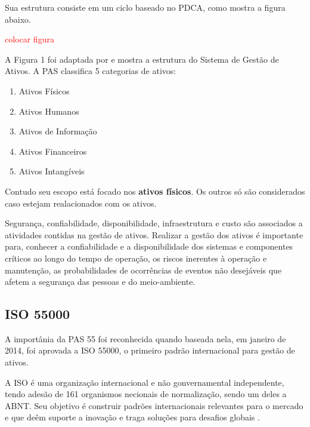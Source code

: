 Sua estrutura consiste em um ciclo baseado no PDCA, como mostra a figura abaixo.

\textcolor{red}{colocar figura}


A Figura 1 foi adaptada por \cite{valeria2013} e mostra a estrutura do Sistema de Gestão de Ativos. A PAS classifica 5 categorias de ativos:

\begin{enumerate}
	\item{Ativos Físicos}
	\item{Ativos Humanos}
	\item{Ativos de Informação}
	\item{Ativos Financeiros}
	\item{Ativos Intangíveis}
\end{enumerate}

Contudo seu escopo está focado nos \textbf{ativos físicos}. Os outros só são considerados caso estejam realacionados com os ativos.

Segurança, confiabilidade, disponibilidade, infraestrutura e custo são associados a atividades contidas na gestão de ativos. 
Realizar a gestão dos ativos é importante para, conhecer a confiabilidade e a disponibilidade dos sistemas e componentes críticos ao longo do tempo de operação, os riscos inerentes à operação e manutenção, as probabilidades de ocorrências de eventos não desejáveis que afetem a segurança das pessoas e do meio-ambiente.


\subsection{ISO 55000}

A importânia da PAS 55 foi reconhecida quando baseada nela, em janeiro de 2014, foi aprovada a ISO 55000, o primeiro padrão internacional para gestão de ativos. 

A ISO é uma organização internacional e não gonvernamental independente, tendo adesão de 161 organismos necionais de normalização, sendo um deles a ABNT. Seu objetivo é construir padrões internacionais relevantes para o mercado e que deêm suporte a inovação e traga soluções para desafios globais .





